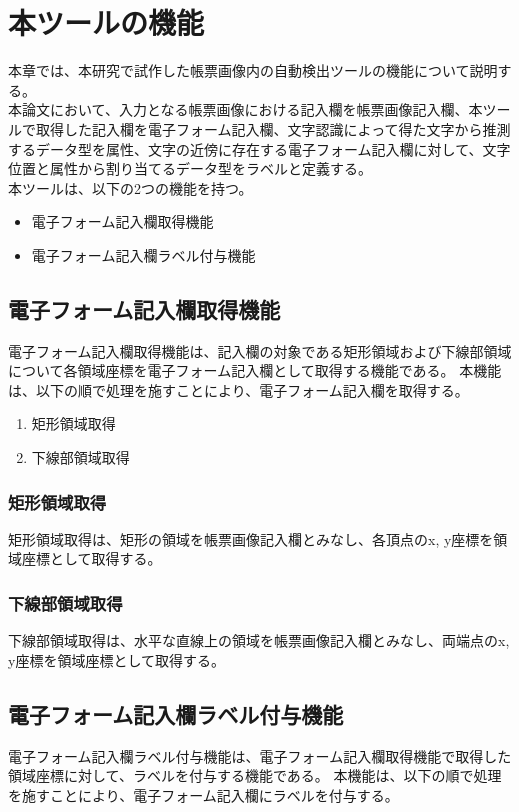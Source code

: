 \chapter{本ツールの機能}\label{cha:Function}
本章では、本研究で試作した帳票画像内の自動検出ツールの機能について説明する。\\
本論文において、入力となる帳票画像における記入欄を帳票画像記入欄、本ツールで取得した記入欄を電子フォーム記入欄、文字認識によって得た文字から推測するデータ型を属性、文字の近傍に存在する電子フォーム記入欄に対して、文字位置と属性から割り当てるデータ型をラベルと定義する。\\
本ツールは、以下の2つの機能を持つ。

\begin{itemize}
  \item 電子フォーム記入欄取得機能
  \item 電子フォーム記入欄ラベル付与機能
\end{itemize}


\section{電子フォーム記入欄取得機能}\label{sec:eform_write_space_obtainment_feature}
電子フォーム記入欄取得機能は、記入欄の対象である矩形領域および下線部領域について各領域座標を電子フォーム記入欄として取得する機能である。
本機能は、以下の順で処理を施すことにより、電子フォーム記入欄を取得する。

\begin{enumerate}[label=(\arabic*)]
  \item 矩形領域取得
  \item 下線部領域取得
\end{enumerate}

\subsection{矩形領域取得}\label{subsec:rect_coords_obtainment}
矩形領域取得は、矩形の領域を帳票画像記入欄とみなし、各頂点のx, y座標を領域座標として取得する。

\subsection{下線部領域取得}\label{subsec:underline_coords_obtainment}
下線部領域取得は、水平な直線上の領域を帳票画像記入欄とみなし、両端点のx, y座標を領域座標として取得する。


\section{電子フォーム記入欄ラベル付与機能}\label{sec:label_link}
電子フォーム記入欄ラベル付与機能は、電子フォーム記入欄取得機能で取得した領域座標に対して、ラベルを付与する機能である。
本機能は、以下の順で処理を施すことにより、電子フォーム記入欄にラベルを付与する。

